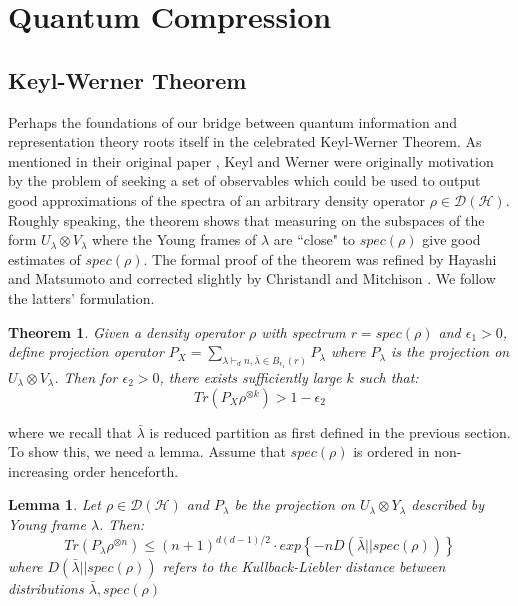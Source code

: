 \documentclass[12pt]{article}%
\newtheorem{thm}{Theorem}
\newtheorem{lemma}{Lemma}
\begin{document}
\section{Quantum Compression}

\subsection{Keyl-Werner Theorem}
Perhaps the foundations of our bridge between quantum information and representation theory roots itself in the celebrated Keyl-Werner Theorem. As mentioned in their original paper \cite{KW}, Keyl and Werner were originally motivation by the problem of seeking a set of observables which could be used to output good approximations of the spectra of an arbitrary density operator $\rho \in \mathcal{D}(\mathcal{H})$.  Roughly speaking, the theorem shows that measuring on the subspaces of the form $U_\lambda \otimes V_\lambda$ where the Young frames of $\lambda$ are ``close" to $spec(\rho)$ give good estimates of $spec(\rho)$. The formal proof of the theorem was refined by Hayashi and Matsumoto \cite{HM} and corrected slightly by Christandl and Mitchison \cite{CM}. We follow the latters' formulation.

\begin{thm} \label{keyl}
  Given a density operator $\rho$ with spectrum $r  = spec(\rho)$ and $\epsilon_1 > 0$, define projection operator $P_X = \sum_{\lambda \vdash_d n, \bar{\lambda} \in B_{\epsilon_1}(r)} P_{\lambda}$ where $P_{\lambda}$ is the projection on $U_{\lambda} \otimes V_{\lambda}$. Then for $\epsilon_2 > 0$, there exists sufficiently large $k$ such that:
  $$  Tr(P_X \rho^{\otimes k}) > 1 - \epsilon_2$$
\end{thm}

\noindent where we recall that $\bar{\lambda}$ is reduced partition as first defined in the previous section. To show this, we need a lemma.  Assume that $spec(\rho)$ is ordered in non-increasing order henceforth.

\begin{lemma}
  Let $\rho \in \mathcal{D}(\mathcal{H})$ and $P_{\lambda}$ be the projection on $U_{\lambda} \otimes Y_{\lambda}$ described by Young frame $\lambda$. Then:
  $$Tr(P_{\lambda}\rho^{\otimes n}) \leq (n+1)^{d(d-1)/2} \cdot exp \left\{-n D(\bar{\lambda}||spec(\rho)) \right\} $$
  where $D(\bar{\lambda}||spec(\rho))$ refers to the Kullback-Liebler distance between distributions $\bar{\lambda},spec(\rho)$
\end{lemma}
\end{document}
